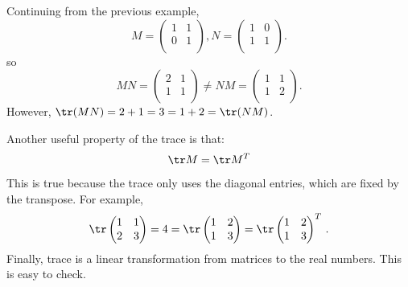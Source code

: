 \begin{example}
Continuing from the previous example, 
\[
M= \begin{pmatrix}
1 & 1 \\
0 & 1 \\
\end{pmatrix}, N=
\begin{pmatrix}
1 & 0 \\
1 & 1 \\
\end{pmatrix}.
\]
so
\[
MN = \begin{pmatrix}
2 & 1 \\
1 & 1 \\
\end{pmatrix} \neq
NM = \begin{pmatrix}
1 & 1 \\
1 & 2 \\
\end{pmatrix}.
\]
However, $\tr(MN) = 2+1 = 3 = 1+2 = \tr(NM)$.
\end{example}

Another useful property of the trace is that:
\[\tr M = \tr M^T\] 
This is true because the trace only uses the diagonal entries, which are fixed by the transpose.  For example, 
\[\tr \begin{pmatrix}
1 & 1 \\
2 & 3 \\
\end{pmatrix} = 4 = \tr \begin{pmatrix}
1 & 2 \\
1 & 3 \\
\end{pmatrix} = \tr \begin{pmatrix}
1 & 2 \\
1 & 3 \\
\end{pmatrix}^T\, .
\]
Finally, trace is a linear transformation from matrices to the real numbers.  This is easy to check.


